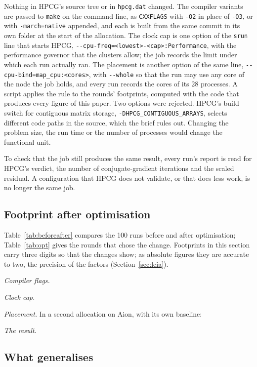 \documentclass[conference,a4paper]{IEEEtran}
\begin{document}
Nothing in HPCG's source tree or in \texttt{hpcg.dat} changed. The compiler
variants are passed to \texttt{make} on the command line, as \texttt{CXXFLAGS}
with \texttt{-O2} in place of \texttt{-O3}, or with \texttt{-march=native}
appended, and each is built from the same commit in its own folder at the start
of the allocation. The clock cap is one option of the \texttt{srun} line that
starts HPCG, \texttt{-{}-cpu-freq=<lowest>-<cap>:Performance}, with the
performance governor that the clusters allow; the job records the limit under
which each run actually ran. The placement is another option of the same line,
\texttt{-{}-cpu-bind=map\_cpu:<cores>}, with \texttt{-{}-whole} so that the run may
use any core of the node the job holds, and every run records the cores of its 28
processes. A script applies the rule to the rounds' footprints, computed with the
code that produces every figure of this paper. Two options were rejected. HPCG's build switch
for contiguous matrix storage, \texttt{-DHPCG\_CONTIGUOUS\_ARRAYS}, selects
different code paths in the source, which the brief rules out. Changing the
problem size, the run time or the number of processes would change the
functional unit.

To check that the job still produces the same result, every run's report is
read for HPCG's verdict, the number of conjugate-gradient iterations and the
scaled residual. A configuration that HPCG does not validate, or that does less
work, is no longer the same job.

\subsection{Footprint after optimisation}\label{sec:afteropt}

Table~\ref{tab:beforeafter} compares the 100 runs before and after optimisation;
Table~\ref{tab:opt} gives the rounds that chose the change. Footprints in this
section carry three digits so that the changes show; as absolute figures they
are accurate to two, the precision of the factors (Section~\ref{sec:lcia}).
\OptValidityText

\emph{Compiler flags.} \OptFlagsPctText\ \OptFlagsText

\emph{Clock cap.} \OptCapText

\emph{Placement.} In a second allocation on Aion, with its own baseline:
\OptPlacementText

\emph{The result.} \OptResultText

\subsection{What generalises}\label{sec:generalises}
\end{document}
